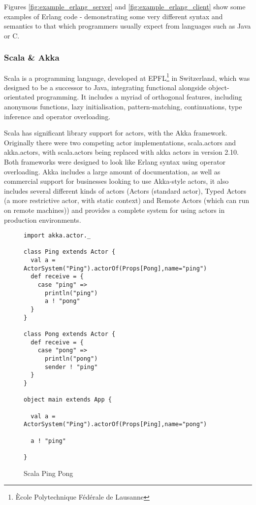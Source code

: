 \documentclass{article}
\begin{document}
Figures \ref{fig:example_erlang_server} and \ref{fig:example_erlang_client} show some examples of Erlang code - demonstrating some very different syntax and semantics to that which programmers usually expect from languages such as Java or C.

\subsubsection{Scala \& Akka}

Scala is a programming language, developed at EPFL\footnote{\`{E}cole Polytechnique F\'{e}d\'{e}rale de Lausanne} in Switzerland, which was designed to be a successor to Java, integrating functional alongside object-orientated programming.
It includes a myriad of orthogonal features, including anonymous functions, lazy initialisation, pattern-matching, continuations, type inference and operator overloading.

Scala has significant library support for actors, with the Akka framework.
Originally there were two competing actor implementations, scala.actors and akka.actors, with scala.actors being replaced with akka actors in version 2.10\cite{scala-actor-migration}.
Both frameworks were designed to look like Erlang syntax using operator overloading.
Akka includes a large amount of documentation, as well as commercial support for businesses looking to use Akka-style actors, it also includes several different kinds of actors (Actors (standard actor), Typed Actors (a more restrictive actor, with static context) and Remote Actors (which can run on remote machines)) and provides a complete system for using actors in production environments.

\begin{figure}[H]
\begin{verbatim}
import akka.actor._

class Ping extends Actor {
  val a = ActorSystem("Ping").actorOf(Props[Pong],name="ping")
  def receive = {
    case "ping" =>
      println("ping")
      a ! "pong"
  }
}

class Pong extends Actor {
  def receive = {
    case "pong" =>
      println("pong")
      sender ! "ping"
  }
}

object main extends App {

  val a = ActorSystem("Ping").actorOf(Props[Ping],name="pong")

  a ! "ping"

}
\end{verbatim}
\caption{Scala Ping Pong}
\label{fig:scala-ping-pong}
\end{figure}
\end{document}
